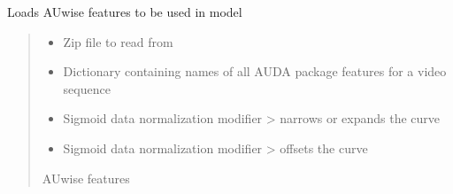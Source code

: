 \documentclass[letterpaper,10pt,english]{sphinxmanual}
\begin{document}

\begin{fulllineitems}
\label{\detokenize{dataset:dataset.load_features_auwise}}
\pysigstartsignatures
{}
\pysigstopsignatures
\sphinxAtStartPar
Loads AU\sphinxhyphen{}wise features to be used in model
\begin{quote}\begin{description}
\begin{itemize}
\item {} 
\sphinxAtStartPar
{} \textendash{} Zip file to read from

\item {} 
\sphinxAtStartPar
{} \textendash{} Dictionary containing names of all AUDA package features for a video sequence

\item {} 
\sphinxAtStartPar
{} \textendash{} Sigmoid data normalization modifier \sphinxhyphen{}\textgreater{} narrows or expands the curve

\item {} 
\sphinxAtStartPar
{} \textendash{} Sigmoid data normalization modifier \sphinxhyphen{}\textgreater{} offsets the curve

\end{itemize}

\sphinxAtStartPar
AU\sphinxhyphen{}wise features

\end{description}\end{quote}

\end{fulllineitems}

\end{document}
